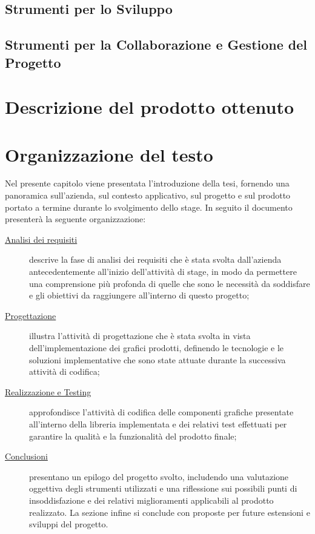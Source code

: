 \begin{itemize}
\subsection{Strumenti per lo Sviluppo}

\subsection{Strumenti per la Collaborazione e Gestione del Progetto}

\section{Descrizione del prodotto ottenuto}

\section{Organizzazione del testo}
Nel presente capitolo viene presentata l'introduzione della tesi, fornendo una panoramica sull'azienda, sul contesto applicativo,
sul progetto e sul prodotto portato a termine durante lo svolgimento dello stage. \newline
In seguito il documento presenterà la seguente organizzazione:

\begin{description}
\item[{\hyperref[chap:analisi-requisiti]{Analisi dei requisiti}}] descrive la fase di analisi dei requisiti che è stata
svolta dall'azienda antecedentemente all'inizio dell'attività di stage, in modo da permettere una comprensione più profonda
di quelle che sono le necessità da soddisfare e gli obiettivi da raggiungere all'interno di questo progetto;

\item[{\hyperref[chap:pregettazione]{Progettazione}}] illustra l'attività di progettazione che è stata svolta in vista dell'implementazione
dei grafici prodotti, definendo le tecnologie e le soluzioni implementative che sono state attuate durante la successiva attività di codifica;

\item[{\hyperref[chap:analisi-requisiti]{Realizzazione e Testing}}] approfondisce l'attività di codifica delle componenti grafiche presentate
all'interno della libreria implementata e dei relativi test effettuati per garantire la qualità e la funzionalità del prodotto finale;

\item[{\hyperref[chap:conclusioni]{Conclusioni}}] presentano un epilogo del progetto svolto, includendo una valutazione oggettiva
degli strumenti utilizzati e una riflessione sui possibili punti di insoddisfazione e dei relativi miglioramenti applicabili al prodotto realizzato.
La sezione infine si conclude con proposte per future estensioni e sviluppi del progetto.


\end{description}
\end{itemize}
